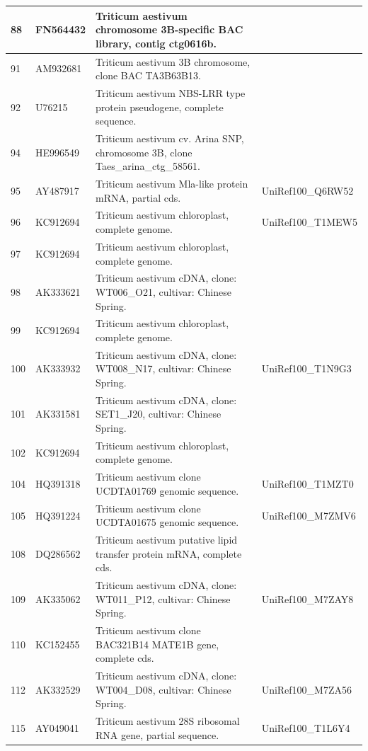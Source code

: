 \documentclass[10.9pt]{article} %
\begin{document}
{\begin{longtable}{|p{1.5cm}|p{2cm}|p{9cm}|p{3cm}|}
\hline
88 & FN564432 & Triticum aestivum chromosome 3B-specific BAC library, contig ctg0616b. & \\
\hline
91 & AM932681 & Triticum aestivum 3B chromosome, clone BAC TA3B63B13. & \\
\hline
92 & U76215 & Triticum aestivum NBS-LRR type protein pseudogene, complete sequence. & \\
\hline
94 & HE996549 & Triticum aestivum cv. Arina SNP, chromosome 3B, clone Taes\_arina\_ctg\_58561. & \\
\hline
95 & AY487917 & Triticum aestivum Mla-like protein mRNA, partial cds. & UniRef100\_Q6RW52\\
\hline
96 & KC912694 & Triticum aestivum chloroplast, complete genome. & UniRef100\_T1MEW5\\
\hline
97 & KC912694 & Triticum aestivum chloroplast, complete genome. & \\
\hline
98 & AK333621 & Triticum aestivum cDNA, clone: WT006\_O21, cultivar: Chinese Spring. & \\
\hline
99 & KC912694 & Triticum aestivum chloroplast, complete genome. & \\
\hline
100 & AK333932 & Triticum aestivum cDNA, clone: WT008\_N17, cultivar: Chinese Spring. & UniRef100\_T1N9G3\\
\hline
101 & AK331581 & Triticum aestivum cDNA, clone: SET1\_J20, cultivar: Chinese Spring. & \\
\hline
102 & KC912694 & Triticum aestivum chloroplast, complete genome. & \\
\hline
104 & HQ391318 & Triticum aestivum clone UCDTA01769 genomic sequence. & UniRef100\_T1MZT0\\
\hline
105 & HQ391224 & Triticum aestivum clone UCDTA01675 genomic sequence. & UniRef100\_M7ZMV6\\
\hline
108 & DQ286562 & Triticum aestivum putative lipid transfer protein mRNA, complete cds. & \\
\hline
109 & AK335062 & Triticum aestivum cDNA, clone: WT011\_P12, cultivar: Chinese Spring. & UniRef100\_M7ZAY8\\
\hline
110 & KC152455 & Triticum aestivum clone BAC321B14 MATE1B gene, complete cds. & \\
\hline
112 & AK332529 & Triticum aestivum cDNA, clone: WT004\_D08, cultivar: Chinese Spring. & UniRef100\_M7ZA56\\
\hline
115 & AY049041 & Triticum aestivum 28S ribosomal RNA gene, partial sequence. & UniRef100\_T1L6Y4\\
\hline

\end{longtable}}
\end{document}
